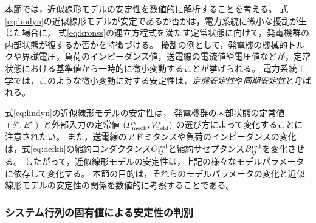 \documentclass[tombow,dvipdfmx]{corona-a5}
\begin{document}
本節では，近似線形モデルの安定性を数値的に解析することを考える。
式\ref{eq:lindyn}の近似線形モデルが安定であるか否かは，電力系統に微小な擾乱が生じた場合に，
式\ref{eq:kronss}の連立方程式を満たす定常状態に向けて，発電機群の内部状態が復するか否かを特徴づける。
擾乱の例として，発電機の機械的トルクや界磁電圧，負荷のインピーダンス値，送電線の電流値や電圧値などが，定常状態における基準値から一時的に微小変動することが挙げられる。
電力系統工学では，このような微小変動に対する安定性は，\emph{定態安定性}や\emph{同期安定性}と呼ばれる。


式\ref{eq:lindyn}の近似線形モデルの安定性は，
発電機群の内部状態の定常値
$(\delta^{\star},E^{\star})$
と外部入力の定常値
$(P_{{\rm mech}}^{\star},V_{{\rm field}}^{\star})$
の選び方によって変化することに注意されたい。
また，送電線のアドミタンスや負荷のインピーダンスの変化は，式\ref{eq:defkh}の縮約コンダクタンス$G^{\rm red}_{ij}$と縮約サセプタンス$B^{\rm red}_{ij}$を変化させる。
したがって，近似線形モデルの安定性は，上記の様々なモデルパラメータに依存して変化する。
本節の目的は，それらのモデルパラメータの変化と近似線形モデルの安定性の関係を数値的に考察することである。

\subsubsection{システム行列の固有値による安定性の判別}
\end{document}
